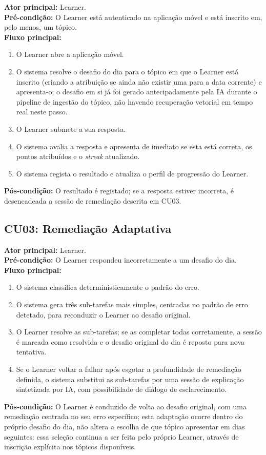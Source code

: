 \textbf{Ator principal:} Learner.\\
\textbf{Pré-condição:} O Learner está autenticado na aplicação móvel e está inscrito em, pelo menos, um tópico.\\
\textbf{Fluxo principal:}
\begin{enumerate}
    \item O Learner abre a aplicação móvel.
    \item O sistema resolve o desafio do dia para o tópico em que o Learner está inscrito (criando a atribuição se ainda não existir uma para a data corrente) e apresenta-o; o desafio em si já foi gerado antecipadamente pela IA durante o pipeline de ingestão do tópico, não havendo recuperação vetorial em tempo real neste passo.
    \item O Learner submete a sua resposta.
    \item O sistema avalia a resposta e apresenta de imediato se esta está correta, os pontos atribuídos e o \textit{streak} atualizado.
    \item O sistema regista o resultado e atualiza o perfil de progressão do Learner.
\end{enumerate}
\textbf{Pós-condição:} O resultado é registado; se a resposta estiver incorreta, é desencadeada a sessão de remediação descrita em CU03.

\subsection{CU03: Remediação Adaptativa}

\textbf{Ator principal:} Learner.\\
\textbf{Pré-condição:} O Learner respondeu incorretamente a um desafio do dia.\\
\textbf{Fluxo principal:}
\begin{enumerate}
    \item O sistema classifica deterministicamente o padrão do erro.
    \item O sistema gera três sub-tarefas mais simples, centradas no padrão de erro detetado, para reconduzir o Learner ao desafio original.
    \item O Learner resolve as sub-tarefas; se as completar todas corretamente, a sessão é marcada como resolvida e o desafio original do dia é reposto para nova tentativa.
    \item Se o Learner voltar a falhar após esgotar a profundidade de remediação definida, o sistema substitui as sub-tarefas por uma sessão de explicação sintetizada por IA, com possibilidade de diálogo de esclarecimento.
\end{enumerate}
\textbf{Pós-condição:} O Learner é conduzido de volta ao desafio original, com uma remediação centrada no seu erro específico; esta adaptação ocorre dentro do próprio desafio do dia, não altera a escolha de que tópico apresentar em dias seguintes: essa seleção continua a ser feita pelo próprio Learner, através de inscrição explícita nos tópicos disponíveis.
